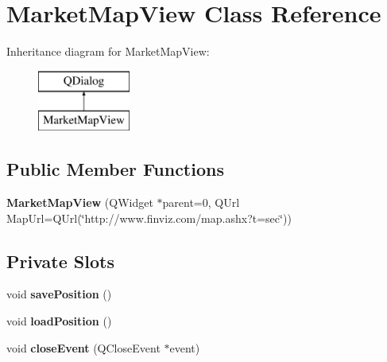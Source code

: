 \hypertarget{class_market_map_view}{\section{Market\+Map\+View Class Reference}
\label{class_market_map_view}
}
Inheritance diagram for Market\+Map\+View\+:\begin{figure}[H]
\begin{center}
\leavevmode
\includegraphics[height=2.000000cm]{class_market_map_view}
\end{center}
\end{figure}
\subsection*{Public Member Functions}
\begin{DoxyCompactItemize}
\item 
\hypertarget{class_market_map_view_ad68b944d6f3ef350a1d6925b2f974a90}{{\bfseries Market\+Map\+View} (Q\+Widget $\ast$parent=0, Q\+Url Map\+Url=Q\+Url(\char`\"{}http\+://www.\+finviz.\+com/map.\+ashx?t=sec\char`\"{}))}\label{class_market_map_view_ad68b944d6f3ef350a1d6925b2f974a90}

\end{DoxyCompactItemize}
\subsection*{Private Slots}
\begin{DoxyCompactItemize}
\item 
\hypertarget{class_market_map_view_ae680dd9e4cffd99085ce9d0aecaebd0c}{void {\bfseries save\+Position} ()}\label{class_market_map_view_ae680dd9e4cffd99085ce9d0aecaebd0c}

\item 
\hypertarget{class_market_map_view_a5bf3380427a2fca3737acff9c0e82bf2}{void {\bfseries load\+Position} ()}\label{class_market_map_view_a5bf3380427a2fca3737acff9c0e82bf2}

\item 
\hypertarget{class_market_map_view_aeb74298240bbc6d4af02e06c3cc8aa79}{void {\bfseries close\+Event} (Q\+Close\+Event $\ast$event)}\label{class_market_map_view_aeb74298240bbc6d4af02e06c3cc8aa79}

\end{DoxyCompactItemize}
